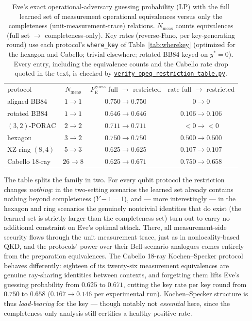 \documentclass[aps,pra,twocolumn,superscriptaddress,longbibliography,nofootinbib]{revtex4-2}
\newcommand{\Eve}{\mathrm{E}}
\newcommand{\pguess}{P_{\Eve}^{\mathrm{guess}}}
\newcommand{\wherekey}{\texttt{where\_key}}
\newcommand{\repoBase}{https://github.com/eliewolfe/RandomnessWinterSchool2026/blob/main/paper/scripts}
\newcommand{\repoScript}[1]{\href{\repoBase/#1}{\texttt{#1}}}
\begin{document}
\begin{table}
\caption{\label{tab:opeqs}Eve's exact operational-adversary guessing
probability (LP) with the full learned set of measurement operational
equivalences versus only the completeness (unit-measurement-trace)
relations. $N_{\mathrm{meas}}$ counts equivalences (full set
$\to$ completeness-only). Key rates (reverse-Fano, per key-generating
round) use each protocol's \wherekey{} of
Table~\ref{tab:wherekey} (optimized for the hexagon and Cabello;
trivial elsewhere; rotated BB84 keyed on $y^{\ast}=0$). Every entry,
including the equivalence counts and the Cabello rate drop quoted in
the text, is checked by
\repoScript{verify\_opeq\_restriction\_table.py}.}
\begin{ruledtabular}
\begin{tabular}{lccc}
protocol & $N_{\mathrm{meas}}$ & $\pguess$ full $\to$ restricted & rate full $\to$ restricted \\
\colrule
aligned BB84    & $1\to1$   & $0.750 \to 0.750$ & $0 \to 0$ \\
rotated BB84    & $1\to1$   & $0.646 \to 0.646$ & $0.106 \to 0.106$ \\
$(3,2)$-PORAC   & $2\to2$   & $0.711 \to 0.711$ & $<0 \to <0$ \\
hexagon         & $3\to2$   & $0.750 \to 0.750$ & $0.500 \to 0.500$ \\
XZ ring $(8,4)$ & $5\to3$   & $0.625 \to 0.625$ & $0.107 \to 0.107$ \\
Cabello 18-ray  & $26\to8$  & $0.625 \to 0.671$ & $0.750 \to 0.658$ \\
\end{tabular}
\end{ruledtabular}
\end{table}

The table splits the family in two. For every qubit protocol the
restriction changes \emph{nothing}: in the two-setting scenarios the
learned set already contains nothing beyond completeness ($Y{-}1=1$),
and --- more interestingly --- in the hexagon and ring scenarios the
genuinely nontrivial identities that do exist (the learned set is
strictly larger than the completeness set) turn out to carry no
additional constraint on Eve's optimal attack. There, all
measurement-side security flows through the unit measurement trace,
just as in nonlocality-based QKD, and the protocols' power over their
Bell-scenario analogues comes entirely from the preparation
equivalences. The Cabello 18-ray Kochen--Specker protocol behaves
differently: eighteen of its twenty-six measurement equivalences are
genuine ray-sharing identities between contexts, and forgetting them
lifts Eve's guessing probability from $0.625$ to $0.671$, cutting the
key rate per key round from $0.750$ to $0.658$ ($0.167\to0.146$ per
experimental run). Kochen--Specker structure is thus \emph{load-bearing}
for the key --- though notably not \emph{essential} here, since the
completeness-only analysis still certifies a healthy positive rate.
\end{document}
